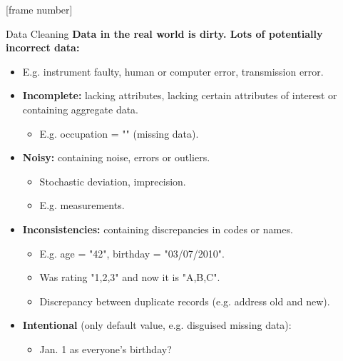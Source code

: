 \documentclass[aspectratio=169,t]{beamer}
\begin{document}
  {
    [frame number]
    \begin{frame}{Data Cleaning}
      \textbf{Data in the real world is {\color{airforceblue}dirty}. Lots of potentially incorrect data:}
      \begin{itemize}
        \item E.g. instrument faulty, human or computer error, transmission error.
        \item \textbf{\color{airforceblue}Incomplete:} lacking attributes, lacking certain attributes of interest or containing aggregate data.
        \begin{itemize}
          \item E.g. occupation = "" (missing data).
        \end{itemize}
        \item \textbf{\color{airforceblue}Noisy:} containing noise, errors or outliers.
        \begin{itemize}
          \item Stochastic deviation, imprecision.
          \item E.g. measurements.
        \end{itemize}
        \item \textbf{\color{airforceblue}Inconsistencies:} containing discrepancies in codes or names.
        \begin{itemize}
          \item E.g. age = "42", birthday = "03/07/2010".
          \item Was rating "1,2,3" and now it is "A,B,C".
          \item Discrepancy between duplicate records (e.g. address old and new).
        \end{itemize}
        \item \textbf{\color{airforceblue}Intentional} (only default value, e.g. disguised missing data):
        \begin{itemize}
          \item Jan. 1 as everyone's birthday?
        \end{itemize}
      \end{itemize}
    \end{frame}
  }
\end{document}
